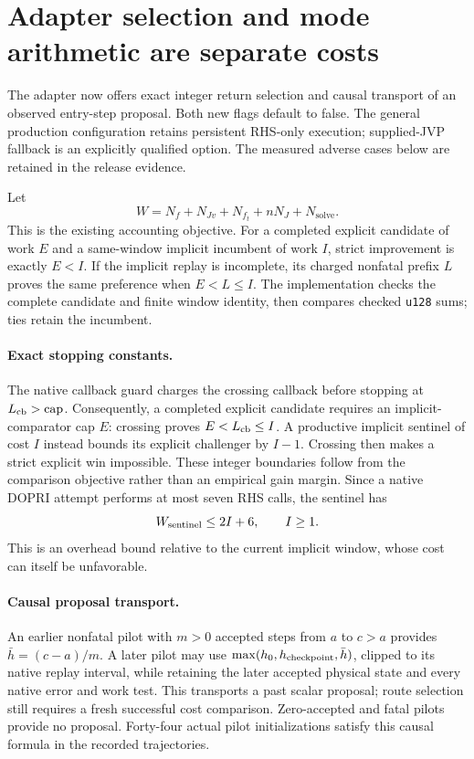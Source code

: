 \section{Adapter selection and mode arithmetic are separate costs}
\label{sec:production-adapter}

The adapter now offers exact integer return selection and causal transport
of an observed entry-step proposal. Both new flags default to false.
The general production configuration retains persistent RHS-only execution;
supplied-JVP fallback is an explicitly qualified option. The measured adverse
cases below are retained in the release evidence.

Let
\begin{equation}
 W=N_f+N_{Jv}+N_{f_t}+nN_J+N_{\mathrm{solve}}.
\end{equation}
This is the existing accounting objective. For a completed explicit
candidate of work $E$ and a same-window implicit incumbent of work $I$,
strict improvement is exactly $E<I$. If the implicit replay is incomplete,
its charged nonfatal prefix $L$ proves the same preference when $E<L\le I$.
The implementation checks the complete candidate and finite window identity,
then compares checked \texttt{u128} sums; ties retain the incumbent.

\paragraph{Exact stopping constants.}
The native callback guard charges the crossing callback before stopping at
$L_{\rm cb}>\mathrm{cap}$. Consequently, a completed explicit candidate
requires an implicit-comparator cap $E$: crossing proves $E<L_{\rm cb}\le I$.
A productive implicit sentinel of cost $I$ instead bounds its explicit
challenger by $I-1$. Crossing then makes a strict explicit win impossible.
These integer boundaries follow from the comparison objective rather than
an empirical gain margin. Since a native DOPRI attempt performs at most seven
RHS calls, the sentinel has
\begin{equation}
 W_{\rm sentinel}\le 2I+6,\qquad I\ge1.
\end{equation}
This is an overhead bound relative to the current implicit window, whose
cost can itself be unfavorable.

\paragraph{Causal proposal transport.}
An earlier nonfatal pilot with $m>0$ accepted steps from $a$ to $c>a$
provides $\bar h=(c-a)/m$. A later pilot may use
$\max(h_0,h_{\rm checkpoint},\bar h)$, clipped to its native replay interval,
while retaining the later accepted physical state and every native error
and work test. This transports a past scalar proposal; route selection still
requires a fresh successful cost comparison. Zero-accepted and fatal pilots
provide no proposal. Forty-four actual pilot initializations satisfy this
causal formula in the recorded trajectories.

